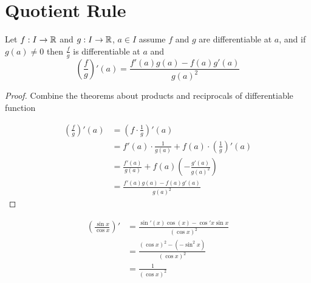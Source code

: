 \section{Quotient Rule}
\begin{theorem*}
  Let $f: I \to \mathbb R$ and $g: I \to \mathbb R$, $a\in I$ assume $f$ and $g$ are differentiable at $a$, and if $g(a) \neq 0$
  then $\frac{f}{g}$ is differentiable at $a$ and $$\left(\frac{f}{g}\right)'(a) = \frac{f'(a)g(a) - f(a)g'(a)}{g(a)^2}$$
\end{theorem*}
\begin{proof}
  Combine the theorems about products and reciprocals of differentiable function

  \begin{align*}
  \left(\frac{f}{g}\right)'(a) &= \left(f \cdot \frac{1}{g}\right)'(a) \\
  &= f'(a) \cdot \frac{1}{g(a)} + f(a) \cdot \left(\frac{1}{g}\right)'(a) \\
  &= \frac{f'(a)}{g(a)} + f(a)\left(-\frac{g'(a)}{g(a)^2}\right) \\
  &= \frac{f'(a)g(a) - f(a)g'(a)}{g(a)^2}
  \end{align*}
\end{proof}

\begin{example*}
  \begin{align*}
    \left(\frac{\sin x}{\cos x}\right)' &= \frac{\sin'(x) \cos(x) - \cos' x \sin x}{(\cos x)^2} \\
    &= \frac{(\cos x)^2 - (-\sin ^2 x)}{(\cos x)^2} \\
    &= \frac{1}{(\cos x)^2} \\
  \end{align*}
\end{example*}